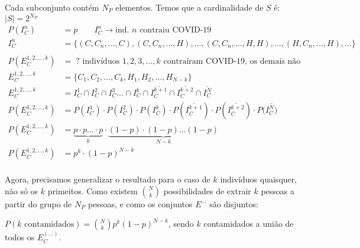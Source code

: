 \documentclass{article}
\newcommand\ov[1]{\overline{#1}}
\begin{document}
Cada subconjunto contém $N_P$ elementos. Temos que a cardinalidade de $S$ é: $|S| = 2^{N_P}$
\begin{align*}
    P(I^n_C) &= p \qquad I^n_C \rightarrow \text{ind. $n$ contraiu COVID-19} \\
    I^n_C &= \{(C,C_n,\ldots,C),(C,C_n,\ldots,H),\ldots,(C,C_n,\ldots,H,H),\ldots,(H,C_n,\ldots,H),\ldots\} \\\\
    P(E^{1,2,\ldots,k}_C) &= \; ? \text{ indivíduos } 1,2,3,\ldots,k \text{ contraíram COVID-19, os demais não} \\
    E^{1,2,\ldots,k}_C &= \{C_1,C_2,\ldots,C_k,H_1,H_2,\ldots,H_{N-k}\} \\
    E^{1,2,\ldots,k}_C &= I_C^1 \cap I_C^2 \cap I_C^3 \ldots \cap I_C^k \cap \ov{I_C^{k+1}} \cap \ov{I_C^{k+2}} \cap \ov{I_C^{N}} \\
    P(E^{1,2,\ldots,k}_C) &= P(I_C^1) \cdot P(I_C^2) \cdot P(I_C^k) \cdot P(\ov{I_C^{k+1}}) \cdot
    P(\ov{I_C^{k+2}}) \cdot P(\ov{I_C^N)} \\
    P(E^{1,2,\ldots,k}_C) &= \underbrace{p \cdot p \ldots \cdot p}_{k} \cdot \underbrace{(1-p)
    \cdot (1-p) \ldots (1-p)}_{N-k} \\
    P(E^{1,2,\ldots,k}_C) &= p^k \cdot (1-p)^{N-k}
\end{align*}
\\[-0.5em]
Agora, precisamos generalizar o resultado para o caso de $k$ indivíduos quaisquer, não só os $k$
primeitos. Como existem ${N \choose k}$ possibilidades de extrair $k$ pessoas a partir do grupo de
$N_P$ pessoas, e como os conjuntos $E^{\ldots}$ são disjuntos:

$P(k \text{ contamidados}) = {N \choose k} p^k (1-p)^{N-k}$, sendo $k$ contamidados a união de
todos os $E^{(\ldots)}_C$.
\end{document}
